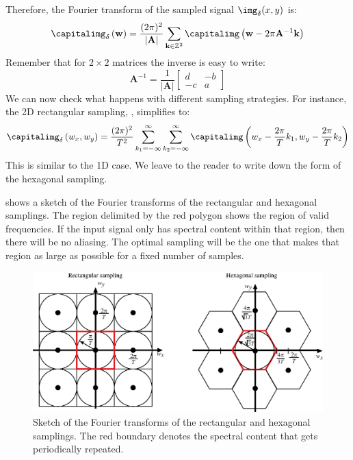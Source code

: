 Therefore, the Fourier transform of the sampled signal $\img_{\delta} (x,y)$ is:
\begin{equation}
    \capitalimg_{\delta} \left( \mathbf{w} \right) =  \frac{(2 \pi)^2}{|\mathbf{A}|} \sum_{\mathbf{k} \in \mathbb{Z}^2} \capitalimg \left( \mathbf{w} - 2 \pi \mathbf{A}^{-1} \mathbf{k} \right)
    \label{eq:genericsampling}
\end{equation}
Remember that for $2\times2$ matrices the inverse is easy to write:
\begin{equation}
    \mathbf{A}^{-1} = \frac{1}{|\mathbf{A}|} \left[
        \begin{array}{cc}
            d  & -b \\
            -c & a
        \end{array}
        \right]
\end{equation}
We can now check what happens with different sampling strategies. For instance, the 2D rectangular sampling, \eqn{\ref{eq:genericsampling}}, simplifies to:
\begin{equation}
    \capitalimg_{\delta} \left(w_x, w_y \right) =  \frac{(2 \pi)^2}{T^2} \sum_{k_1=-\infty}^{\infty} \sum_{k_2=-\infty}^{\infty} \capitalimg \left( w_x - \frac{2\pi}{T}k_1, w_y - \frac{2\pi}{T}k_2 \right)
\end{equation}
This is similar to the 1D case. We leave to the reader to write down the form of the hexagonal sampling.



\Fig{\ref{fig:sampling_grids_FT}} shows a sketch of the Fourier transforms of the rectangular and hexagonal samplings. The region delimited by the red polygon shows the region of valid frequencies. If the input signal only has spectral content within that region, then there will be no aliasing. The optimal sampling will be the one that makes that region as large as possible for a fixed number of samples.



\begin{figure}[t]
    \centerline{
        \includegraphics[width=1\linewidth]{figures/Image_processing_sampling/sampling_grids_FT.eps}
    }
    \caption{Sketch of the Fourier transforms of the rectangular and hexagonal samplings. The red boundary denotes the spectral content that gets periodically repeated.}
    \label{fig:sampling_grids_FT}
\end{figure}

